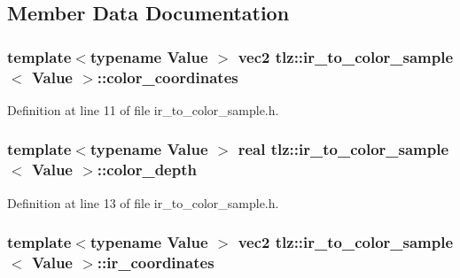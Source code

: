 \subsection{Member Data Documentation}
\subsubsection[{\texorpdfstring{color\+\_\+coordinates}{color_coordinates}}]{\setlength{\rightskip}{0pt plus 5cm}template$<$typename Value $>$ {\bf vec2} {\bf tlz\+::ir\+\_\+to\+\_\+color\+\_\+sample}$<$ Value $>$\+::color\+\_\+coordinates}\hypertarget{structtlz_1_1ir__to__color__sample_ae93e5fa29e82dd8ba7a157e06563dfc7}{}\label{structtlz_1_1ir__to__color__sample_ae93e5fa29e82dd8ba7a157e06563dfc7}


Definition at line 11 of file ir\+\_\+to\+\_\+color\+\_\+sample.\+h.

\subsubsection[{\texorpdfstring{color\+\_\+depth}{color_depth}}]{\setlength{\rightskip}{0pt plus 5cm}template$<$typename Value $>$ {\bf real} {\bf tlz\+::ir\+\_\+to\+\_\+color\+\_\+sample}$<$ Value $>$\+::color\+\_\+depth}\hypertarget{structtlz_1_1ir__to__color__sample_a1b39105fe64f453fe447bab716082a3a}{}\label{structtlz_1_1ir__to__color__sample_a1b39105fe64f453fe447bab716082a3a}


Definition at line 13 of file ir\+\_\+to\+\_\+color\+\_\+sample.\+h.

\subsubsection[{\texorpdfstring{ir\+\_\+coordinates}{ir_coordinates}}]{\setlength{\rightskip}{0pt plus 5cm}template$<$typename Value $>$ {\bf vec2} {\bf tlz\+::ir\+\_\+to\+\_\+color\+\_\+sample}$<$ Value $>$\+::ir\+\_\+coordinates}\hypertarget{structtlz_1_1ir__to__color__sample_ade7d220f572d24c176c79f4babb168b3}{}\label{structtlz_1_1ir__to__color__sample_ade7d220f572d24c176c79f4babb168b3}



